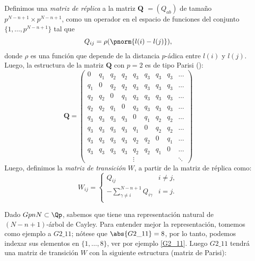 Definimos una \textit{matriz de réplica} a la matriz $\textbf{Q   }=(Q_{ab}) $ de tamaño $p^{N-n+1}\times p^{N-n+1}$, como un operador en el espacio de funciones del conjunto $\{1,\dots,p^{N-n+1}\}$ tal que 
\begin{equation}\label{Q}
Q_{ij}=\rho(\pnorm{l(i)-l(j)}),
\end{equation}
donde $\rho$ es una función que depende de la distancia $p$-ádica entre $l(i)$ y $l(j)$. 
Luego, la estructura de la matriz $\textbf{Q}$ con $p=2$ es de tipo Parisi (\cite{Parisi-2000}):
$$
\boldsymbol{Q}=\left(\begin{array}{lllllllll}
0 & q_{1} & q_{2} & q_{2} & q_{3} & q_{3} & q_{3} & q_{3} & \dots \\
q_{1} & 0 & q_{2} & q_{2} & q_{3} & q_{3} & q_{3} & q_{3} & \dots \\
q_{2} & q_{2} & 0 & q_{1} & q_{3} & q_{3} & q_{3} & q_{3} & \dots \\
q_{2} & q_{2} & q_{1} & 0 & q_{3} & q_{3} & q_{3} & q_{3} & \dots \\
q_{3} & q_{3} & q_{3} & q_{3} & 0 & q_{1} & q_{2} & q_{2} & \dots \\
q_{3} & q_{3} & q_{3} & q_{3} & q_{1} & 0 & q_{2} & q_{2} & \dots \\
q_{3} & q_{3} & q_{3} & q_{3} & q_{2} & q_{2} & 0 & q_{1} & \dots \\
q_{3} & q_{3} & q_{3} & q_{3} & q_{2} & q_{2} & q_{1} & 0 & \dots\\
&  &  &  & \vdots & & &  & \ddots
\end{array}\right)
$$
Luego, definimos la \textit{matriz de transición } $W$, a partir de la matriz de réplica como:
\[   
W_{ij} =
\begin{cases}
Q_{ij} & i\neq j,\\
-\sum_{\gamma \neq i}^{N-n+1}Q_{i\gamma} &i=j.\\

\end{cases}
\]

Dado $GpnN\subset \Qp$, sabemos que tiene una representación natural de $(N-n+1)$-árbol de Cayley. Para entender mejor la representación, tomemos como ejemplo a $G2\_11$; nótese que $\abs{G2\_11}=8$, por lo tanto, podemos indexar sus elementos en $\{1,\dots,8\}$, ver por ejemplo \ref{G2_11}. Luego $G2\_11$ tendrá una matriz de transición $W$ con la siguiente estructura (matriz de Parisi):

